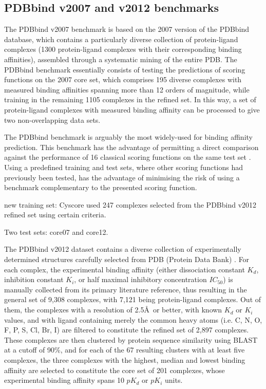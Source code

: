 \documentclass[journal=jacsat,manuscript=article]{achemso}
\begin{document}
\subsection{PDBbind v2007 and v2012 benchmarks}

The PDBbind v2007 benchmark is based on the 2007 version of the PDBbind database, which contains a particularly diverse collection of protein-ligand complexes (1300 protein-ligand complexes with their corresponding binding affinities), assembled through a systematic mining of the entire PDB. The PDBbind benchmark essentially consists of testing the predictions of scoring functions on the 2007 core set, which comprises 195 diverse complexes with measured binding affinities spanning more than 12 orders of magnitude, while training in the remaining 1105 complexes in the refined set. In this way, a set of protein-ligand complexes with measured binding affinity can be processed to give two non-overlapping data sets.

The PDBbind benchmark is arguably the most widely-used for binding affinity prediction. This benchmark has the advantage of permitting a direct comparison against the performance of 16 classical scoring functions on the same test set \cite{1313}. Using a predefined training and test sets, where other scoring functions had previously been tested, has the advantage of minimising the risk of using a benchmark complementary to the presented scoring function.

new training set: Cyscore used 247 complexes selected from the PDBbind v2012 refined set using certain criteria.

Two test sets: core07 and core12.

The PDBbind v2012 dataset contains a diverse collection of experimentally determined structures carefully selected from PDB (Protein Data Bank) \cite{540,537}. For each complex, the experimental binding affinity (either dissociation constant $K_d$, inhibition constant $K_i$, or half maximal inhibitory concentration $IC_{50}$) is manually collected from its primary literature reference, thus resulting in the general set of 9,308 complexes, with 7,121 being protein-ligand complexes. Out of them, the complexes with a resolution of 2.5\AA\ or better, with known $K_d$ or $K_i$ values, and with ligand containing merely the common heavy atoms (i.e. C, N, O, F, P, S, Cl, Br, I) are filtered to constitute the refined set of 2,897 complexes. These complexes are then clustered by protein sequence similarity using BLAST at a cutoff of 90\%, and for each of the 67 resulting clusters with at least five complexes, the three complexes with the highest, median and lowest binding affinity are selected to constitute the core set of 201 complexes, whose experimental binding affinity spans 10 $pK_d$ or $pK_i$ units.
\end{document}
